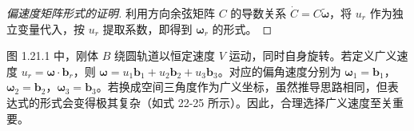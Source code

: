 \begin{proof}[偏速度矩阵形式的证明]
利用方向余弦矩阵 \(C\) 的导数关系 \(\dot{C} = C \widetilde{\boldsymbol{\omega}}\)，将 \(u_r\) 作为独立变量代入，按 \(u_r\) 提取系数，即得到 \(\boldsymbol{\omega}_r\) 的形式。
\end{proof}

\begin{example}[圆周运动刚体的偏速度]
图 1.21.1 中，刚体 \(B\) 绕圆轨道以恒定速度 \(V\) 运动，同时自身旋转。若定义广义速度 \(u_r = \boldsymbol{\omega} \cdot \mathbf{b}_r\)，则 \(\boldsymbol{\omega} = u_1 \mathbf{b}_1 + u_2 \mathbf{b}_2 + u_3 \mathbf{b}_3\)。对应的偏角速度分别为 \(\boldsymbol{\omega}_1 = \mathbf{b}_1\)，\(\boldsymbol{\omega}_2 = \mathbf{b}_2\)，\(\boldsymbol{\omega}_3 = \mathbf{b}_3\)。若换成空间三角度作为广义坐标，虽然推导思路相同，但表达式的形式会变得极其复杂（如式 22-25 所示）。因此，合理选择广义速度至关重要。
\end{example}